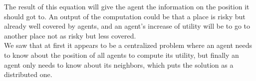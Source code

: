 The result of this equation will give the agent the information on the position it should got to. An output of the computation could be that a place is risky but already well covered by agents, and an agent's increase of utility will be to go to another place not as risky but less covered. \\
We saw that at first it appears to be a centralized problem where an agent needs to know about the position of all agents to compute its utility, but finally an agent only needs to know about its neighbors, which puts the solution as a distributed one.